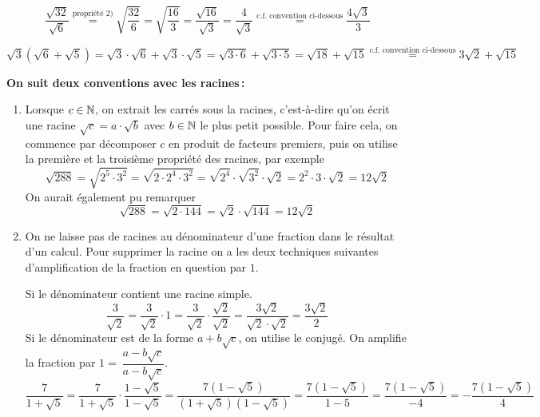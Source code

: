 \documentclass[a4paper,12pt]{report}
\begin{document}
\[\dfrac{\sqrt{32}}{\sqrt{6}}\stackrel{\text{propriété } 2)}{=}\sqrt{\dfrac{32}{6}}=\sqrt{\dfrac{16}{3}}=\dfrac{\sqrt{16}}{\sqrt{3}}=\dfrac{4}{\sqrt{3}}\stackrel{\text{c.f. convention ci-dessous}}{=}\dfrac{4\sqrt{3}}{3}\]

\[\sqrt{3}(\sqrt{6}+\sqrt{5})=\sqrt{3}\cdot \sqrt{6}+\sqrt{3}\cdot \sqrt{5}=\sqrt{3\cdot 6}+\sqrt{3\cdot 5}=\sqrt{18}+\sqrt{15}\stackrel{\text{c.f. convention ci-dessous}}{=}3\sqrt{2}+\sqrt{15}\] 

{\bfseries On suit deux conventions avec les racines\,:}

\begin{enumerate}[label={\arabic*)}]
	\item Lorsque $c\in \mathbb N$, on extrait les carrés sous la racines, c'est-à-dire qu'on écrit une racine $\sqrt{c}=a\cdot \sqrt{b}$ avec $b\in \mathbb N$ le plus petit possible. Pour faire cela, on commence par décomposer $c$ en produit de facteurs premiers, puis on utilise la première et la troisième propriété des racines, par exemple
		\[\sqrt{288}=\sqrt{2^5\cdot 3^2}=\sqrt{2\cdot 2^4\cdot 3^2}=\sqrt{2^4}\cdot \sqrt{3^2}\cdot \sqrt{2}=2^2\cdot 3\cdot \sqrt{2}=12\sqrt{2}\]
		On aurait également pu remarquer
		\[\sqrt{288}=\sqrt{2\cdot 144}=\sqrt{2}\cdot \sqrt{144}=12\sqrt{2}\]
	\item On ne laisse pas de racines au dénominateur d'une fraction dans le résultat d'un calcul. Pour supprimer la racine on a les deux techniques suivantes d'amplification de la fraction en question par $1$.
		
		Si le dénominateur contient une racine simple. 
	\[\dfrac{3}{\sqrt{2}}=\dfrac{3}{\sqrt{2}}\cdot 1=\dfrac{3}{\sqrt{2}}\cdot\dfrac{\sqrt{2}}{\sqrt{2}}=\dfrac{3\sqrt{2}}{\sqrt{2}\cdot \sqrt{2}}=\dfrac{3\sqrt{2}}{2}\]
	Si le dénominateur est de la forme $a+b\sqrt{c}$, on utilise le conjugé. On amplifie la fraction par $1=~\dfrac{a-b\sqrt{c}}{a-b\sqrt{c}}$. 
	\[\dfrac{7}{1+\sqrt{5}}=\dfrac{7}{1+\sqrt{5}}\cdot \dfrac{1-\sqrt{5}}{1-\sqrt{5}}=\dfrac{7(1-\sqrt{5})}{(1+\sqrt{5})(1-\sqrt{5})}=\dfrac{7(1-\sqrt{5})}{1-5}=\dfrac{7(1-\sqrt{5})}{-4}=-\dfrac{7(1-\sqrt{5})}{4}\]
\end{enumerate}


\vspace{1cm}
\end{document}
